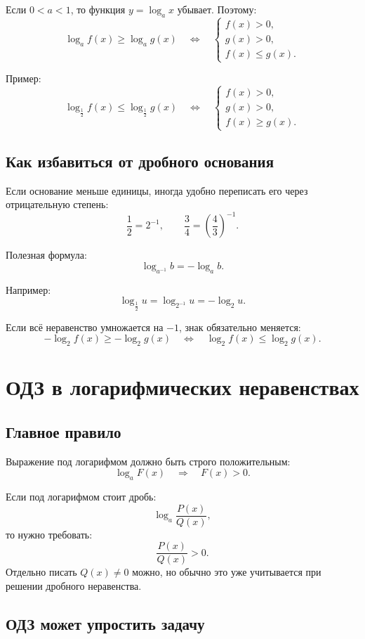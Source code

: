 \documentclass[a4paper,12pt]{article}
\begin{document}
Если \(0<a<1\), то функция \(y=\log_a x\) убывает. Поэтому:
\[
    \log_a f(x) \ge \log_a g(x)
    \quad \Longleftrightarrow \quad
    \begin{cases}
    f(x)>0,\\
    g(x)>0,\\
    f(x)\le g(x).
    \end{cases}
\]

Пример:
\[
    \log_{\frac12} f(x) \le \log_{\frac12} g(x)
    \quad \Longleftrightarrow \quad
    \begin{cases}
    f(x)>0,\\
    g(x)>0,\\
    f(x)\ge g(x).
    \end{cases}
\]

\subsection{Как избавиться от дробного основания}

Если основание меньше единицы, иногда удобно переписать его через отрицательную степень:
\[
    \frac12=2^{-1},\qquad
    \frac34=\left(\frac43\right)^{-1}.
\]

Полезная формула:
\[
    \log_{a^{-1}} b=-\log_a b.
\]

Например:
\[
    \log_{\frac12} u=\log_{2^{-1}}u=-\log_2 u.
\]

Если всё неравенство умножается на \(-1\), знак обязательно меняется:
\[
    -\log_2 f(x)\ge -\log_2 g(x)
    \quad \Longleftrightarrow \quad
    \log_2 f(x)\le \log_2 g(x).
\]

\section{ОДЗ в логарифмических неравенствах}

\subsection{Главное правило}

Выражение под логарифмом должно быть строго положительным:
\[
    \log_a F(x) \quad \Rightarrow \quad F(x)>0.
\]

Если под логарифмом стоит дробь:
\[
    \log_a \frac{P(x)}{Q(x)},
\]
то нужно требовать:
\[
    \frac{P(x)}{Q(x)}>0.
\]
Отдельно писать \(Q(x)\ne 0\) можно, но обычно это уже учитывается при решении дробного неравенства.

\subsection{ОДЗ может упростить задачу}
\end{document}
